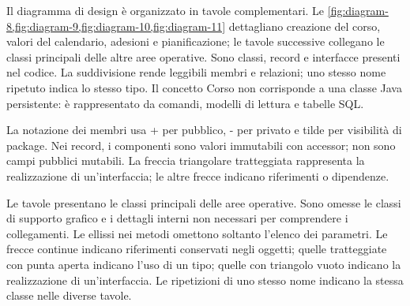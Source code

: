 \documentclass[11pt,a4paper]{article}
\begin{document}
Il diagramma di design è organizzato in tavole complementari. Le \cref{fig:diagram-8,fig:diagram-9,fig:diagram-10,fig:diagram-11} dettagliano creazione del corso, valori del calendario, adesioni e pianificazione; le tavole successive collegano le classi principali delle altre aree operative. Sono classi, record e interfacce presenti nel codice. La suddivisione rende leggibili membri e relazioni; uno stesso nome ripetuto indica lo stesso tipo. Il concetto Corso non corrisponde a una classe Java persistente: è rappresentato da comandi, modelli di lettura e tabelle SQL.

La notazione dei membri usa + per pubblico, - per privato e tilde per visibilità di package. Nei record, i componenti sono valori immutabili con accessor; non sono campi pubblici mutabili. La freccia triangolare tratteggiata rappresenta la realizzazione di un'interfaccia; le altre frecce indicano riferimenti o dipendenze.


Le tavole presentano le classi principali delle aree operative. Sono omesse le classi di supporto grafico e i dettagli interni non necessari per comprendere i collegamenti. Le ellissi nei metodi omettono soltanto l’elenco dei parametri. Le frecce continue indicano riferimenti conservati negli oggetti; quelle tratteggiate con punta aperta indicano l’uso di un tipo; quelle con triangolo vuoto indicano la realizzazione di un’interfaccia. Le ripetizioni di uno stesso nome indicano la stessa classe nelle diverse tavole.
\end{document}
